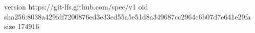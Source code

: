 version https://git-lfs.github.com/spec/v1
oid sha256:8038a429fdf7200876ed3e33cd55a5e51d8a349687cc2964c6b07d7e641e29fa
size 174916
